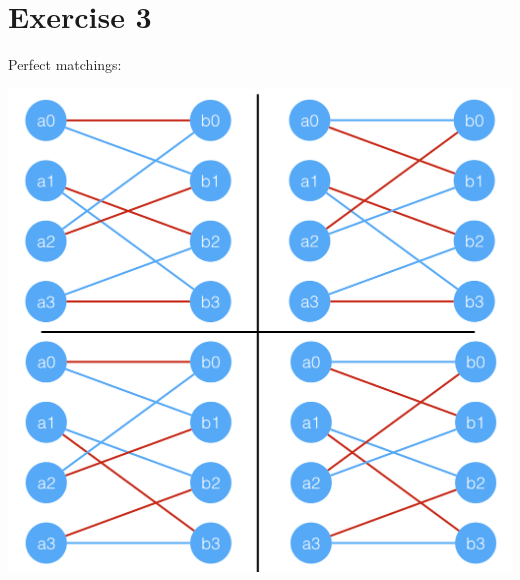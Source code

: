 \documentclass[11pt]{article}
\begin{document}
\section*{Exercise 3}
Perfect matchings:
\begin{center}
  \includegraphics[width=\linewidth]{matchings.png}
\end{center}
\end{document}
